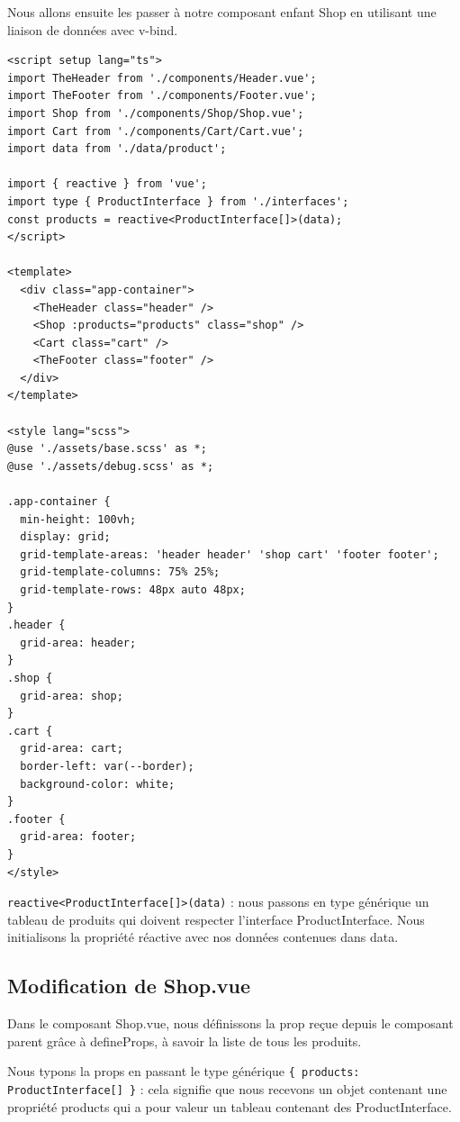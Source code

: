Nous allons ensuite les passer à notre composant enfant Shop en utilisant une liaison de données avec v-bind.
\begin{verbatim}
<script setup lang="ts">
import TheHeader from './components/Header.vue';
import TheFooter from './components/Footer.vue';
import Shop from './components/Shop/Shop.vue';
import Cart from './components/Cart/Cart.vue';
import data from './data/product';

import { reactive } from 'vue';
import type { ProductInterface } from './interfaces';
const products = reactive<ProductInterface[]>(data);
</script>

<template>
  <div class="app-container">
    <TheHeader class="header" />
    <Shop :products="products" class="shop" />
    <Cart class="cart" />
    <TheFooter class="footer" />
  </div>
</template>

<style lang="scss">
@use './assets/base.scss' as *;
@use './assets/debug.scss' as *;

.app-container {
  min-height: 100vh;
  display: grid;
  grid-template-areas: 'header header' 'shop cart' 'footer footer';
  grid-template-columns: 75% 25%;
  grid-template-rows: 48px auto 48px;
}
.header {
  grid-area: header;
}
.shop {
  grid-area: shop;
}
.cart {
  grid-area: cart;
  border-left: var(--border);
  background-color: white;
}
.footer {
  grid-area: footer;
}
</style>
\end{verbatim}
{\tt reactive<ProductInterface[]>(data)} : nous passons en type générique un tableau de produits qui doivent respecter l'interface {\color{monOrange}ProductInterface}. Nous initialisons la propriété réactive avec nos données contenues dans {\color{monOrange}data}.

\subsection{Modification de {\color{monOrange}Shop.vue}}
Dans le composant {\color{monOrange}Shop.vue}, nous définissons la {\color{monOrange}prop} reçue depuis le composant parent grâce à {\color{monOrange}defineProps}, à savoir la liste de tous les produits.

Nous typons la {\color{monOrange}props} en passant le type générique {\tt  \{ products: ProductInterface[] \}} : cela signifie que nous recevons un objet contenant une propriété {\color{monOrange}products} qui a pour valeur un tableau contenant des {\color{monOrange}ProductInterface}.


